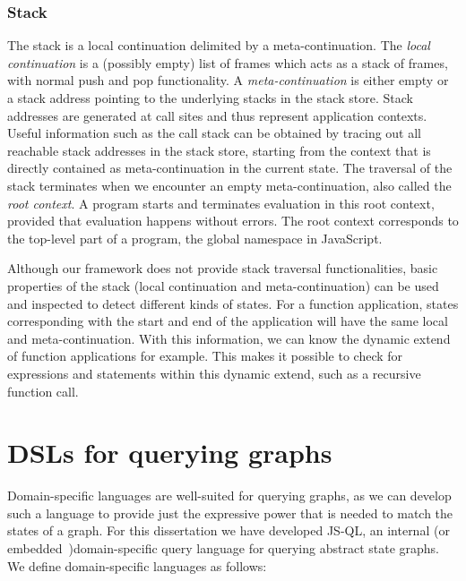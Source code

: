 \subsubsection*{Stack}

The stack is a local continuation delimited by a meta-continuation. The \textit{local continuation} is a (possibly empty) list of frames which acts as a stack of frames, with normal push and pop functionality. A \textit{meta-continuation} is either empty or a stack address pointing to the underlying stacks in the stack store. Stack addresses are generated at call sites and thus represent application contexts. Useful information such as the call stack can be obtained by tracing out all reachable stack addresses in the stack store, starting from the context that is directly contained as meta-continuation in the current state. The traversal of the stack terminates when we encounter an empty meta-continuation, also called the \textit{root context}. A program starts and terminates evaluation in this root context, provided that evaluation happens without errors. The root context corresponds to the top-level part of a program, the global namespace in JavaScript.

Although our framework does not provide stack traversal functionalities, basic properties of the stack (local continuation and meta-continuation) can be used and inspected to detect different kinds of states. For a function application, states corresponding with the start and end of the application will have the same local and meta-continuation. With this information, we can know the dynamic extend of function applications for example. This makes it possible to check for expressions and statements within this dynamic extend, such as a recursive function call.

\section{DSLs for querying graphs}
\label{sec:DSLForQueryingGraphs}

Domain-specific languages are well-suited for querying graphs, as we can develop such a language to provide just the expressive power that is needed to match the states of a graph. For this dissertation we have developed JS-QL, an internal (or embedded~\cite{Hudak:1996})domain-specific query language for querying abstract state graphs. We define domain-specific languages as follows:

